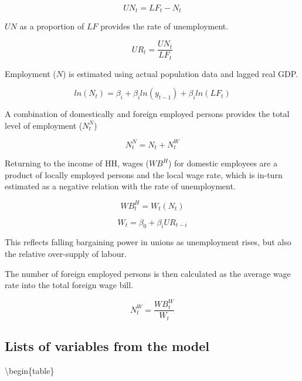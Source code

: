 \documentclass[
]{book}
\begin{document}
\begin{equation}
UN_t = LF_t - N_t
\end{equation}

\(UN\) as a proportion of \(LF\) provides the rate of unemployment.

\begin{equation}
UR_t = \frac{UN_t}{LF_t}
\end{equation}

Employment (\(N\)) is estimated using actual population data and lagged
real GDP.

\begin{equation}
ln(N_t) = \beta _i + \beta _iln(y_{t-1}) + \beta _iln(LF_t)
\end{equation}

A combination of domestically and foreign employed persons provides the total level
of employment (\(N^N_t\))

\begin{equation}
N^N_t = N_t + N^W_t
\end{equation}

Returning to the income of HH, wages (\(WB^H\)) for domestic employees are a product
of locally employed persons and the local wage rate, which is in-turn estimated
as a negative relation with the rate of unemployment.

\begin{equation}
WB^H_t = W_t(N_t)
\end{equation}

\begin{equation}
W_t = \beta _0 + \beta _iUR_{t-i}
\end{equation}

This reflects falling bargaining power in unions as unemployment rises, but also
the relative over-supply of labour.

The number of foreign employed persons is then calculated as the average wage rate
into the total foreign wage bill.

\begin{equation}
N^W_t = \frac{WB^W_t}{W_t}
\end{equation}

\hypertarget{sec:list-of-variables}{%
\subsection{Lists of variables from the model}\label{sec:list-of-variables}}

\textbackslash begin\{table\}
\end{document}
